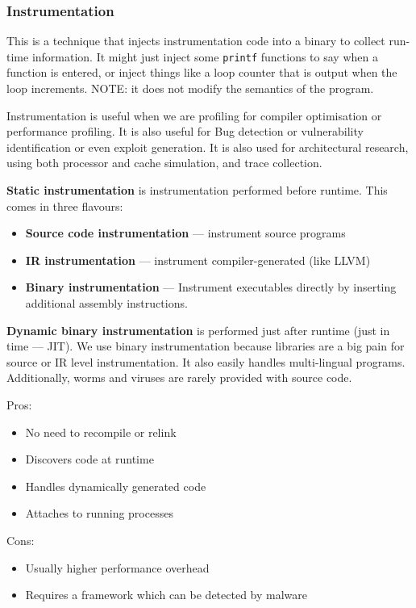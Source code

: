 \documentclass[11pt,a4paper,titlepage,dvipsnames,cmyk]{scrartcl}
\begin{document}
\subsubsection{Instrumentation}
This is a technique that injects instrumentation code into a binary to collect run-time information. It might just inject some \texttt{printf} functions to say when a function is entered, or inject things like a loop counter that is output when the loop increments. NOTE: it does not modify the semantics of the program.

Instrumentation is useful when we are profiling for compiler optimisation or performance profiling. It is also useful for Bug detection or vulnerability identification or even exploit generation. It is also used for architectural research, using both processor and cache simulation, and trace collection.

\textbf{Static instrumentation} is instrumentation performed before runtime. This comes in three flavours:
\begin{itemize}
    \item \textbf{Source code instrumentation} --- instrument source programs
    \item \textbf{IR instrumentation} --- instrument compiler-generated (like LLVM)
    \item \textbf{Binary instrumentation} --- Instrument executables directly by inserting additional assembly instructions.
\end{itemize}

\textbf{Dynamic binary instrumentation} is performed just after runtime (just in time --- JIT). We use binary instrumentation because libraries are a big pain for source or IR level instrumentation. It also easily handles multi-lingual programs. Additionally, worms and viruses are rarely provided with source code.

\begin{itemize}
    {\color{green}
    \item Pros:
    \begin{itemize}
        \item No need to recompile or relink
        \item Discovers code at runtime
        \item Handles dynamically generated code
        \item Attaches to running processes
    \end{itemize}
    }
    {\color{red}
    \item Cons:
    \begin{itemize}
        \item Usually higher performance overhead
        \item Requires a framework which can be detected by malware
    \end{itemize}
    }
\end{itemize}
\end{document}
